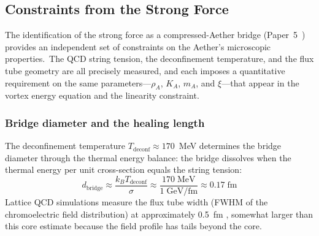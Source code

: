 ﻿\documentclass[12pt,letterpaper]{article}
\newcommand{\rhoa}{\rho_{\!A}}
\newcommand{\Ka}{K_{\!A}}
\begin{document}
\subsection{Constraints from the Strong Force}
\label{sec:strong-constraints}

The identification of the strong force as a compressed-Aether bridge
(Paper~5~\cite{otto-strong}) provides an independent set of constraints on
the Aether's microscopic properties.\ The QCD string tension, the deconfinement
temperature, and the flux tube geometry are all precisely measured, and each
imposes a quantitative requirement on the same parameters---$\rhoa$, $\Ka$,
$m_A$, and $\xi$---that appear in the vortex energy equation and the linearity
constraint.

\subsubsection*{Bridge diameter and the healing length}

The deconfinement temperature $T_{\mathrm{deconf}} \approx 170$~MeV determines
the bridge diameter through the thermal energy balance: the bridge dissolves when
the thermal energy per unit cross-section equals the string tension:
%
\begin{equation}
  d_{\mathrm{bridge}} \approx \frac{k_B T_{\mathrm{deconf}}}{\sigma}
    \approx \frac{170\;\mathrm{MeV}}{1\;\mathrm{GeV/fm}} \approx 0.17\;\mathrm{fm}
  \label{eq:bridge-diameter}
\end{equation}
%
Lattice QCD simulations measure the flux tube width (FWHM of the chromoelectric
field distribution) at approximately 0.5~fm \cite{cardoso2013,cea2024}, somewhat
larger than this core estimate because the field profile has tails beyond the core.
\end{document}
